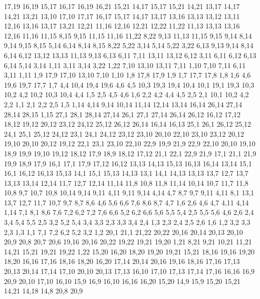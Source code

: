 17,19
16,19
%
15,17
16,17
16,19
16,21
15,21
%
14,17
15,17
15,21
14,21
%
13,17
14,17
14,21
13,21
%
13,10
17,10
17,17
16,17
15,17
14,17
13,17
13,16
13,13
13,12
13,11
%
12,16
13,16
13,17
13,21
12,21
%
11,16
12,16
12,21
12,22
11,22
%
11,13
13,13
13,16
12,16
11,16
11,15
%
8,15
9,15
11,15
11,16
11,22
8,22
%
9,13
11,13
11,15
9,15
9,14
%
8,14
9,14
9,15
8,15
%
5,14
6,14
8,14
8,15
8,22
5,22
%
3,14
5,14
5,22
3,22
%
6,13
9,13
9,14
8,14
6,14
%
6,12
13,12
13,13
11,13
9,13
6,13
%
6,11
7,11
13,11
13,12
6,12
%
3,11
6,11
6,12
6,13
6,14
5,14
3,14
%
1,11
3,11
3,14
3,22
1,22
%
7,10
13,10
13,11
7,11
%
1,10
7,10
7,11
6,11
3,11
1,11
%
1,9
17,9
17,10
13,10
7,10
1,10
%
1,8
17,8
17,9
1,9
%
1,7
17,7
17,8
1,8
%
1,6
4,6
19,6
19,7
17,7
1,7
%
4,4
10,4
19,4
19,6
4,6
4,5
%
10,3
19,3
19,4
10,4
%
10,1
19,1
19,3
10,3
10,2
%
4,2
10,2
10,3
10,4
4,4
%
1,5
2,5
4,5
4,6
1,6
%
2,2
4,2
4,4
4,5
2,5
%
2,1
10,1
10,2
4,2
2,2
%
1,1
2,1
2,2
2,5
1,5
1,14
4,14
9,14
10,14
11,14
12,14
13,14
16,14
26,14
27,14
28,14
28,15
1,15
%
27,1
28,1
28,14
27,14
%
26,1
27,1
27,14
26,14
26,12
%
16,12
17,12
18,12
19,12
20,12
23,12
24,12
25,12
26,12
26,14
16,14
16,13
%
25,1
26,1
26,12
25,12
%
24,1
25,1
25,12
24,12
%
23,1
24,1
24,12
23,12
23,10
%
20,10
22,10
23,10
23,12
20,12
%
19,10
20,10
20,12
19,12
%
22,1
23,1
23,10
22,10
22,9
%
19,9
21,9
22,9
22,10
20,10
19,10
%
18,9
19,9
19,10
19,12
18,12
%
17,9
18,9
18,12
17,12
%
21,1
22,1
22,9
21,9
%
17,1
21,1
21,9
19,9
18,9
17,9
%
16,1
17,1
17,9
17,12
16,12
%
13,13
14,13
15,13
16,13
16,14
13,14
%
15,1
16,1
16,12
16,13
15,13
%
14,1
15,1
15,13
14,13
%
13,1
14,1
14,13
13,13
13,7
%
12,7
13,7
13,13
13,14
12,14
%
11,7
12,7
12,14
11,14
11,8
%
10,8
11,8
11,14
10,14
%
10,7
11,7
11,8
10,8
%
9,7
10,7
10,8
10,14
9,14
9,11
%
4,11
9,11
9,14
4,14
%
4,7
8,7
9,7
9,11
4,11
%
8,1
13,1
13,7
12,7
11,7
10,7
9,7
8,7
8,6
%
4,6
5,6
6,6
7,6
8,6
8,7
4,7
%
1,6
2,6
4,6
4,7
4,11
4,14
1,14
%
7,1
8,1
8,6
7,6
7,2
%
6,2
7,2
7,6
6,6
%
5,2
6,2
6,6
5,6
5,5
5,4
%
2,5
5,5
5,6
4,6
2,6
%
2,4
3,4
5,4
5,5
2,5
%
3,2
5,2
5,4
3,4
3,3
%
2,3
3,3
3,4
2,4
%
1,3
2,3
2,4
2,5
2,6
1,6
%
1,2
3,2
3,3
2,3
1,3
%
1,1
7,1
7,2
6,2
5,2
3,2
1,2
20,1
21,1
21,22
20,22
20,16
20,14
20,13
20,10
20,9
20,8
20,7
20,6
%
19,16
20,16
20,22
19,22
19,21
19,20
%
1,21
8,21
9,21
10,21
11,21
14,21
15,21
19,21
19,22
1,22
%
15,20
16,20
18,20
19,20
19,21
15,21
%
18,16
19,16
19,20
18,20
%
16,16
17,16
18,16
18,20
16,20
%
17,14
20,14
20,16
19,16
18,16
17,16
%
17,13
20,13
20,14
17,14
%
17,10
20,10
20,13
17,13
%
16,10
17,10
17,13
17,14
17,16
16,16
%
16,9
20,9
20,10
17,10
16,10
%
15,9
16,9
16,10
16,16
16,20
15,20
%
14,9
15,9
15,20
15,21
14,21
14,18
%
14,8
20,8
20,9
